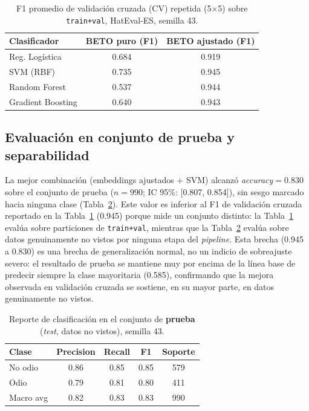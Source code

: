 \documentclass[conference]{IEEEtran}
\begin{document}
\begin{table}[h]
\centering
\small
\begin{tabular}{lcc}
\toprule
\textbf{Clasificador} & \textbf{BETO puro (F1)} & \textbf{BETO ajustado (F1)} \\
\midrule
Reg. Logística & 0.684 & 0.919 \\
SVM (RBF)       & 0.735 & 0.945 \\
Random Forest    & 0.537 & 0.944 \\
Gradient Boosting & 0.640 & 0.943 \\
\bottomrule
\end{tabular}
\caption{F1 promedio de validación cruzada (CV) repetida (5$\times$5) sobre \texttt{train+val}, HatEval-ES, semilla 43.}
\label{tab:cv}
\end{table}

\subsection{Evaluación en conjunto de prueba y separabilidad}
La mejor combinación (embeddings ajustados + SVM) alcanzó \textit{accuracy}$=0.830$ sobre el conjunto de prueba ($n=990$; IC 95\%: {[}0.807, 0.854{]}), sin sesgo marcado hacia ninguna clase (Tabla~\ref{tab:report}). Este valor es inferior al F1 de validación cruzada reportado en la Tabla~\ref{tab:cv} (0.945) porque mide un conjunto distinto: la Tabla~\ref{tab:cv} evalúa sobre particiones de \texttt{train+val}, mientras que la Tabla~\ref{tab:report} evalúa sobre datos genuinamente no vistos por ninguna etapa del \textit{pipeline}. Esta brecha (0.945 a 0.830) es una brecha de generalización normal, no un indicio de sobreajuste severo: el resultado de prueba se mantiene muy por encima de la línea base de predecir siempre la clase mayoritaria (0.585), confirmando que la mejora observada en validación cruzada se sostiene, en su mayor parte, en datos genuinamente no vistos.

\begin{table}[h]
\centering
\small
\begin{tabular}{lcccc}
\toprule
\textbf{Clase} & \textbf{Precision} & \textbf{Recall} & \textbf{F1} & \textbf{Soporte} \\
\midrule
No odio & 0.86 & 0.85 & 0.85 & 579 \\
Odio    & 0.79 & 0.81 & 0.80 & 411 \\
\midrule
Macro avg & 0.82 & 0.83 & 0.83 & 990 \\
\bottomrule
\end{tabular}
\caption{Reporte de clasificación en el conjunto de \textbf{prueba} (\textit{test}, datos no vistos), semilla 43.}
\label{tab:report}
\end{table}
\end{document}
